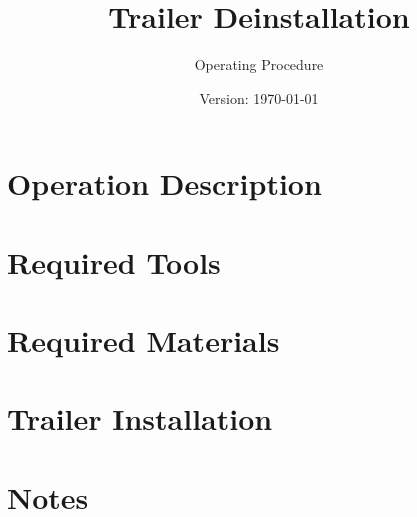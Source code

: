 \documentclass{article}
\title{Trailer Deinstallation}
\author{Operating Procedure}
\date{Version: \isodate\today}
\begin{document}
\maketitle

\thispagestyle{fancy}

\renewcommand{\thesection}{\Alph{section}}

\section{Operation Description}


\section{Required Tools}


\section{Required Materials}


\newpage

\renewcommand{\thesection}{\arabic{section}}

\setcounter{section}{0}

\section{Trailer Installation}


\newpage

\setcounter{section}{0}
\section*{Notes}

\end{document}
